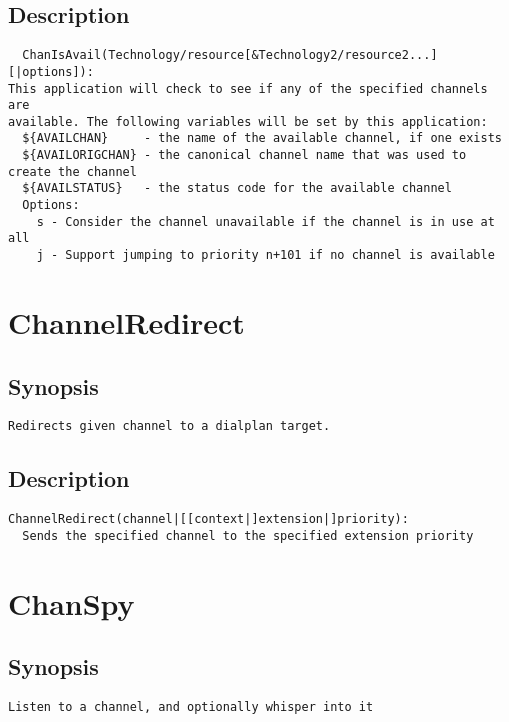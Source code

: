 \subsection{Description}
\begin{verbatim}
  ChanIsAvail(Technology/resource[&Technology2/resource2...][|options]): 
This application will check to see if any of the specified channels are
available. The following variables will be set by this application:
  ${AVAILCHAN}     - the name of the available channel, if one exists
  ${AVAILORIGCHAN} - the canonical channel name that was used to create the channel
  ${AVAILSTATUS}   - the status code for the available channel
  Options:
    s - Consider the channel unavailable if the channel is in use at all
    j - Support jumping to priority n+101 if no channel is available

\end{verbatim}


\section{ChannelRedirect}
\subsection{Synopsis}
\begin{verbatim}
Redirects given channel to a dialplan target.
\end{verbatim}
\subsection{Description}
\begin{verbatim}
ChannelRedirect(channel|[[context|]extension|]priority):
  Sends the specified channel to the specified extension priority

\end{verbatim}


\section{ChanSpy}
\subsection{Synopsis}
\begin{verbatim}
Listen to a channel, and optionally whisper into it
\end{verbatim}
